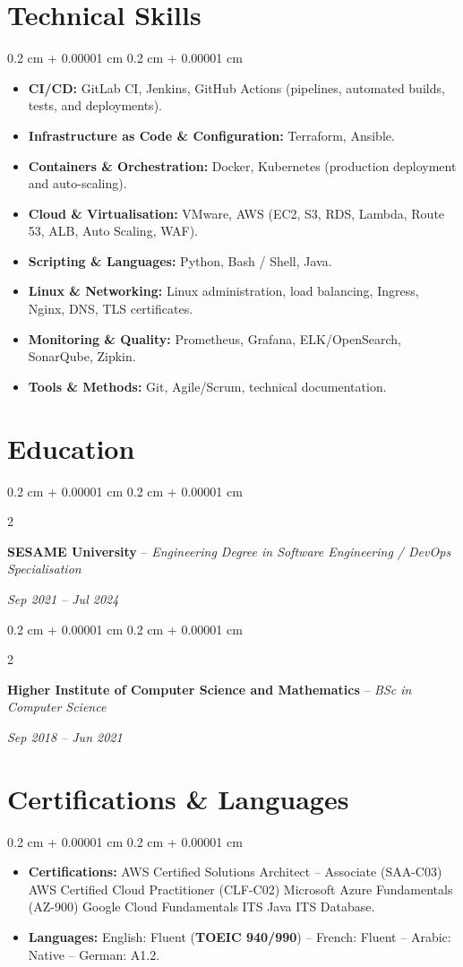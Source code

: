 \documentclass[9pt, letterpaper]{article}
\newenvironment{highlights}{
    \begin{itemize}[
        topsep=0.03 cm,
        parsep=0.03 cm,
        partopsep=0pt,
        itemsep=0pt,
        leftmargin=0.4 cm + 10pt
    ]
}{
    \end{itemize}
}
\newenvironment{onecolentry}{
    \begin{adjustwidth}{
        0.2 cm + 0.00001 cm
    }{
        0.2 cm + 0.00001 cm
    }
}{
    \end{adjustwidth}
}
\newenvironment{twocolentry}[2][]{
    \onecolentry
    \def\secondColumn{#2}
    \setcolumnwidth{\fill, 4.5 cm}
    \begin{paracol}{2}
}{
    \switchcolumn \raggedleft \secondColumn
    \end{paracol}
    \endonecolentry
}
\begin{document}
\section{Technical Skills}
\begin{onecolentry}
\begin{highlights}
\item \textbf{CI/CD:} GitLab CI, Jenkins, GitHub Actions (pipelines, automated builds, tests, and deployments).
\item \textbf{Infrastructure as Code \& Configuration:} Terraform, Ansible.
\item \textbf{Containers \& Orchestration:} Docker, Kubernetes (production deployment and auto-scaling).
\item \textbf{Cloud \& Virtualisation:} VMware, AWS (EC2, S3, RDS, Lambda, Route 53, ALB, Auto Scaling, WAF).
\item \textbf{Scripting \& Languages:} Python, Bash / Shell, Java.
\item \textbf{Linux \& Networking:} Linux administration, load balancing, Ingress, Nginx, DNS, TLS certificates.
\item \textbf{Monitoring \& Quality:} Prometheus, Grafana, ELK/OpenSearch, SonarQube, Zipkin.
\item \textbf{Tools \& Methods:} Git, Agile/Scrum, technical documentation.
\end{highlights}
\end{onecolentry}

\section{Education}
\begin{twocolentry}{\textit{Sep 2021 -- Jul 2024}}
\textbf{SESAME University} -- \textit{Engineering Degree in Software Engineering / DevOps Specialisation}
\end{twocolentry}
\begin{twocolentry}{\textit{Sep 2018 -- Jun 2021}}
\textbf{Higher Institute of Computer Science and Mathematics} -- \textit{BSc in Computer Science}
\end{twocolentry}

\section{Certifications \& Languages}
\begin{onecolentry}
\begin{highlights}
\item \textbf{Certifications:} AWS Certified Solutions Architect -- Associate (SAA-C03) \textbullet{} AWS Certified Cloud Practitioner (CLF-C02) \textbullet{} Microsoft Azure Fundamentals (AZ-900) \textbullet{} Google Cloud Fundamentals \textbullet{} ITS Java \textbullet{} ITS Database.
\item \textbf{Languages:} English: Fluent (\textbf{TOEIC 940/990}) \quad -- \quad French: Fluent \quad -- \quad Arabic: Native \quad -- \quad German: A1.2.
\end{highlights}
\end{onecolentry}
\end{document}
